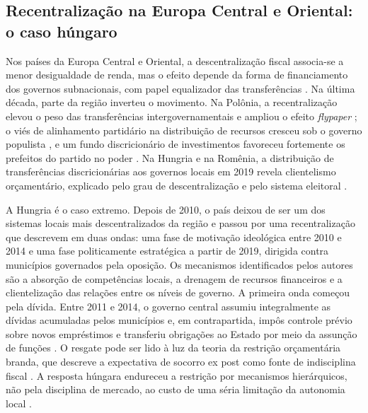 \subsection{Recentralização na Europa Central e Oriental: o caso húngaro}\label{sec:hungria_lit}

Nos países da Europa Central e Oriental, a descentralização fiscal associa-se a menor desigualdade de renda, mas o efeito depende da forma de financiamento dos governos subnacionais, com papel equalizador das transferências \citep{Makreshanska-Mladenovska2019123}. Na última década, parte da região inverteu o movimento. Na Polônia, a recentralização elevou o peso das transferências intergovernamentais e ampliou o efeito \textit{flypaper} \citep{Poniatowicz202489}; o viés de alinhamento partidário na distribuição de recursos cresceu sob o governo populista \citep{Siwinska-Gorzelak2023927}, e um fundo discricionário de investimentos favoreceu fortemente os prefeitos do partido no poder \citep{Gendzwi2025331}. Na Hungria e na Romênia, a distribuição de transferências discricionárias aos governos locais em 2019 revela clientelismo orçamentário, explicado pelo grau de descentralização e pelo sistema eleitoral \citep{Gherghina2023}.

A Hungria é o caso extremo. Depois de 2010, o país deixou de ser um dos sistemas locais mais descentralizados da região e passou por uma recentralização que \citet{Dobos2025} descrevem em duas ondas: uma fase de motivação ideológica entre 2010 e 2014 e uma fase politicamente estratégica a partir de 2019, dirigida contra municípios governados pela oposição. Os mecanismos identificados pelos autores são a absorção de competências locais, a drenagem de recursos financeiros e a clientelização das relações entre os níveis de governo. A primeira onda começou pela dívida. Entre 2011 e 2014, o governo central assumiu integralmente as dívidas acumuladas pelos municípios \citep{Vasvari2020571} e, em contrapartida, impôs controle prévio sobre novos empréstimos e transferiu obrigações ao Estado por meio da assunção de funções \citep{Bethlendi2018, Racz202191}. O resgate pode ser lido à luz da teoria da restrição orçamentária branda, que descreve a expectativa de socorro ex post como fonte de indisciplina fiscal \citep{Kornai2003}. A resposta húngara endureceu a restrição por mecanismos hierárquicos, não pela disciplina de mercado, ao custo de uma séria limitação da autonomia local \citep{Vasvari2020571}.

